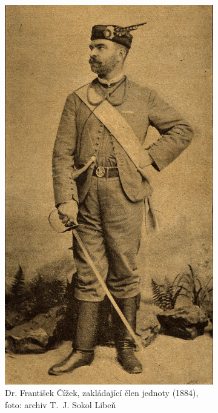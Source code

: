 \documentclass[a5paper, 12pt, twoside]{article}
\begin{document}
\begin{figure}[h]
  \centering
  \begin{subfigure}[c]{0.4\textwidth}
  \includegraphics[width=\textwidth]{img/cizek.jpg}
  \caption*{Dr. František Čížek, zakládající člen jednoty (1884), foto: archiv T.~J. Sokol Libeň }
  \end{subfigure}
  \hfill
  \begin{subfigure}[c]{0.5\textwidth}

\end{subfigure}
\end{figure}
\end{document}
